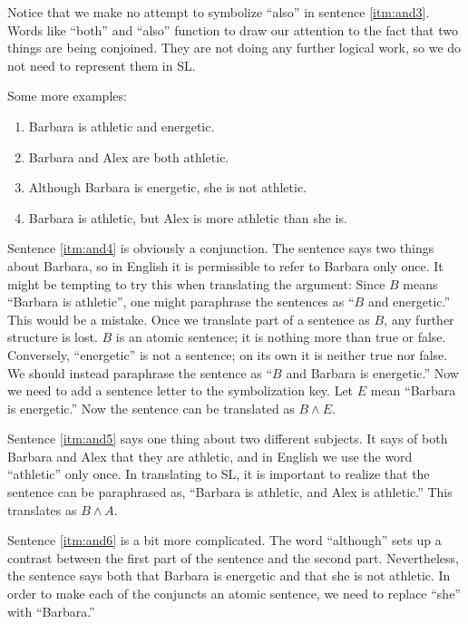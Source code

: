 Notice that we make no attempt to symbolize ``also'' in sentence \ref{itm:and3}. Words like ``both'' and ``also'' function to draw our attention to the fact that two things are being conjoined. They are not doing any further logical work, so we do not need to represent them in SL.

Some more examples:
\begin{enumerate}
\item Barbara is athletic and energetic. \label{itm:and4}
\item Barbara and Alex are both athletic. \label{itm:and5}
\item Although Barbara is energetic, she is not athletic. \label{itm:and6}
\item Barbara is athletic, but Alex is more athletic than she is. \label{itm:and7}
\end{enumerate}

Sentence \ref{itm:and4} is obviously a conjunction. The sentence says two things about Barbara, so in English it is permissible to refer to Barbara only once. It might be tempting to try this when translating the argument: Since $B$ means ``Barbara is athletic'', one might paraphrase the sentences as ``$B$ and energetic.'' This would be a mistake. Once we translate part of a sentence as $B$, any further structure is lost. $B$ is an atomic sentence; it is nothing more than true or false. Conversely, ``energetic'' is not a sentence; on its own it is neither true nor false. We should instead paraphrase the sentence as ``$B$ and Barbara is energetic.'' Now we need to add a sentence letter to the symbolization key. Let $E$ mean ``Barbara is energetic.'' Now the sentence can be translated as $B \land E$.

Sentence \ref{itm:and5} says one thing about two different subjects. It says of both Barbara and Alex that they are athletic, and in English we use the word ``athletic'' only once. In translating to SL, it is important to realize that the sentence can be paraphrased as, ``Barbara is athletic, and Alex is athletic.'' This translates as $B \land A$.

Sentence \ref{itm:and6} is a bit more complicated. The word ``although'' sets up a contrast between the first part of the sentence and the second part. Nevertheless, the sentence says both that Barbara is energetic and that she is not athletic. In order to make each of the conjuncts an atomic sentence, we need to replace ``she'' with ``Barbara.''

